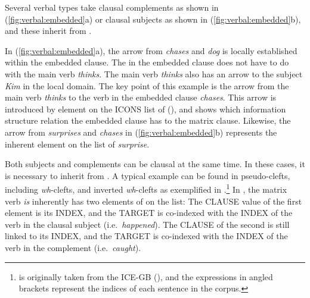 Several verbal types take clausal complements as shown in
(\ref{fig:verbal:embedded}a) or clausal subjects as shown in
(\ref{fig:verbal:embedded}b), and these inherit from
.





\noindent In (\ref{fig:verbal:embedded}a), the arrow from
\textit{chases} and \textit{dog} is locally established within the
embedded clause.  The  in the embedded clause
does not have to do with the main verb \textit{thinks}. The main verb
\textit{thinks} also has an arrow to the subject \textit{Kim} in the
local domain. The key point of this example is the arrow from the main
verb \textit{thinks} to the verb in the embedded clause
\textit{chases}. This arrow is introduced by element on the ICONS list
of  (), and shows which information
structure relation the embedded clause has to the matrix
clause. Likewise, the arrow from \textit{surprises} and
\textit{chases} in (\ref{fig:verbal:embedded}b) represents the
inherent  element on the  list of
\textit{surprise}.


Both subjects and complements can be clausal at the same time.  In
these cases, it is necessary to inherit from .
A typical example can be found in pseudo-clefts,
including \textit{wh}-clefts, and inverted \textit{wh}-clefts as
exemplified in .\footnote{
   is originally taken from the ICE-GB
  (\citealt{nelson:etal:02}), and the expressions in angled brackets
  represent the indices of each sentence in the corpus.}  In
, the matrix verb \textit{is} inherently has
two elements of  on the 
list: The CLAUSE value of the first element is
its INDEX, and the TARGET is co-indexed with the INDEX of the verb in
the clausal subject (i.e.\ \textit{happened}). The CLAUSE of the
second is still linked to its INDEX, and the TARGET is co-indexed with
the INDEX of the verb in the complement
(i.e.\ \textit{caught}).




